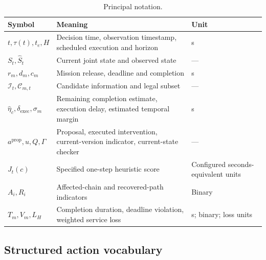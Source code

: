 \documentclass[11pt,a4paper]{article}
\begin{document}
\begin{table}[H]
\centering
\small
\setlength{\tabcolsep}{3pt}
\caption{Principal notation.}
\label{tab:S8}
\begin{tabularx}{\textwidth}{@{}lYY@{}}
\toprule
Symbol & Meaning & Unit \\
\midrule
$t,\tau(t),t_e,H$ & Decision time, observation timestamp, scheduled execution and horizon & s \\
$S_t,\widehat S_t$ & Current joint state and observed state & --- \\
$r_m,d_m,c_m$ & Mission release, deadline and completion & s \\
$\mathcal I_t,\mathcal C_{m,t}$ & Candidate information and legal subset & --- \\
$\widehat\eta_c,\delta_{\mathrm{exec}},\sigma_m$ & Remaining completion estimate, execution delay, estimated temporal margin & s \\
$a^{\mathrm{prop}},u,Q,\Gamma$ & Proposal, executed intervention, current-version indicator, current-state checker & --- \\
$J_t(c)$ & Specified one-step heuristic score & Configured seconds-equivalent units \\
$A_i,R_i$ & Affected-chain and recovered-path indicators & Binary \\
$T_m,V_m,L_H$ & Completion duration, deadline violation, weighted service loss & s; binary; loss units \\
\bottomrule
\end{tabularx}
\end{table}

\subsection{Structured action vocabulary}
\end{document}
